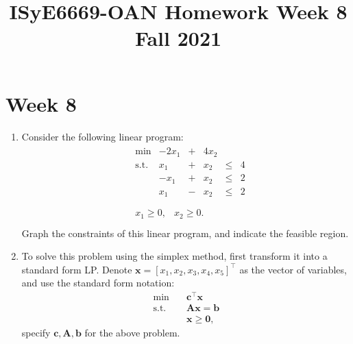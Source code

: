 \documentclass[11pt]{article}
\title{ISyE6669-OAN Homework Week 8\\ Fall 2021}
\date{}
\newcommand{\mb}[1]{\ensuremath{\boldsymbol{#1}}}
\begin{document}
\maketitle

\section{Week 8}
	\begin{enumerate}
		\item Consider the following linear program:
	\begin{eqnarray*}
		&\begin{array}{cccccc}
			\min & -2x_1 & + & 4x_2 & & \\
			\text{s.t.} & x_1  & + & x_2  & \leq & 4 \\
			& -x_1 & + & x_2 & \leq & 2 \\
			& x_1 & - & x_2 & \leq & 2 \\
		\end{array} \\
		&\begin{array}{rr}
			x_1\geq 0, & x_2\geq 0. \\
		\end{array}
	\end{eqnarray*}
		Graph the constraints of this linear program, and indicate the feasible region.
		
	\item To solve this problem using the simplex method, first transform it into a standard form LP.
Denote $\mb{x}=[x_1,x_2,x_3,x_4,x_5]^\top$ as the vector of variables, and use the standard form notation: 
\begin{align*}
\min \quad & \mb{c}^\top\mb{x} \\
\text{s.t.}\quad & \mb{A}\mb{x} = \mb{b} \\
& \mb{x}\geq \mb{0},
\end{align*}
specify $\mb{c},\mb{A},\mb{b}$ for the above problem.


\end{enumerate}
\end{document}
